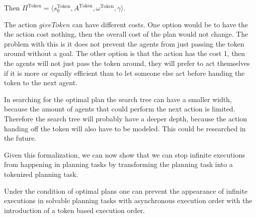 Then $ \Pi^{\text{Token}} = \langle s_0^{\text{Token}}, A ^{\text{Token}}, \omega ^{\text{Token}}, \gamma \rangle $.

The action $giveToken$ can have different costs. One option would be to have the the action cost nothing, then the overall cost of the plan would not change. The problem with this is it does not prevent the agents from just passing the token around without a goal. The other option is that the action has the cost 1, then the agents will not just pass the token around, they will prefer to act themselves if it is more or equally efficient than to let someone else act before handing the token to the next agent.

In searching for the optimal plan the search tree can have a smaller width, because the amount of agents that could perform the next action is limited. Therefore the search tree will probably have a deeper depth, because the action handing off the token will also have to be modeled. This could be researched in the future.


Given this formalization, we can now show that we can stop infinite executions from happening in planning tasks by transforming the planning task into a tokenized planning task.

\begin{theorem}
Under the condition of optimal plans one can prevent the appearance of infinite executions in solvable planning tasks with asynchronous execution order with the introduction of a token based execution order.
\end{theorem}


